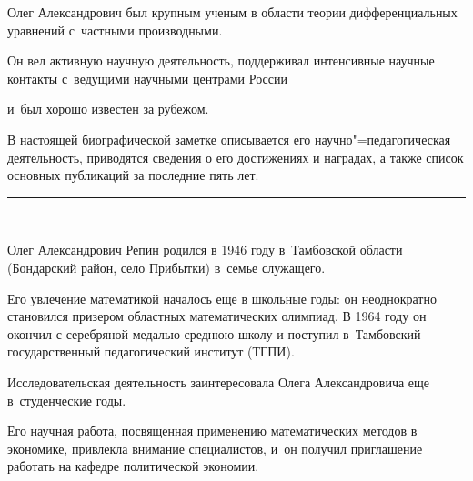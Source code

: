 Олег Александрович был крупным ученым в области теории дифференциальных уравнений с~частными производными.

Он вел активную научную деятельность,  поддерживал интенсивные научные контакты с~ведущими научными центрами России 

и~был хорошо  известен за рубежом. 



В настоящей биографической заметке описывается его научно"=педагогическая деятельность, приводятся сведения о его достижениях  и наградах, а также список основных публикаций за последние пять лет.










\renewcommand{\JournalDataOnline}{\displaydate{repinoae}}



\smallskip



\par\noindent

\theonlinerudate \par\noindent

\rule{68mm}{.7pt}\\







\normalsize



Олег Александрович Репин родился в 1946 году в~Тамбовской области (Бондарский район, село Прибытки) в~семье служащего. 

Его увлечение математикой началось еще в школьные годы: он неоднократно становился призером областных математических олимпиад. В 1964 году он окончил с серебряной медалью среднюю школу и поступил в~Тамбовский государственный педагогический институт (ТГПИ).%



Исследовательская деятельность заинтересовала Олега Александровича еще в~студенческие годы. 

Его научная работа, посвященная применению математических методов в экономике, привлекла внимание специалистов, и~он получил приглашение работать на кафедре политической экономии. 

